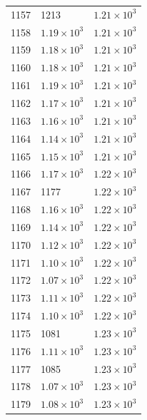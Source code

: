 \begin{table}[H]
\begin{tabular}{lll}
1157 & 1213 & $\displaystyle 1.21 \times 10^{3}$ \\
1158 & $\displaystyle 1.19 \times 10^{3}$ & $\displaystyle 1.21 \times 10^{3}$ \\
1159 & $\displaystyle 1.18 \times 10^{3}$ & $\displaystyle 1.21 \times 10^{3}$ \\
1160 & $\displaystyle 1.18 \times 10^{3}$ & $\displaystyle 1.21 \times 10^{3}$ \\
1161 & $\displaystyle 1.19 \times 10^{3}$ & $\displaystyle 1.21 \times 10^{3}$ \\
1162 & $\displaystyle 1.17 \times 10^{3}$ & $\displaystyle 1.21 \times 10^{3}$ \\
1163 & $\displaystyle 1.16 \times 10^{3}$ & $\displaystyle 1.21 \times 10^{3}$ \\
1164 & $\displaystyle 1.14 \times 10^{3}$ & $\displaystyle 1.21 \times 10^{3}$ \\
1165 & $\displaystyle 1.15 \times 10^{3}$ & $\displaystyle 1.21 \times 10^{3}$ \\
1166 & $\displaystyle 1.17 \times 10^{3}$ & $\displaystyle 1.22 \times 10^{3}$ \\
1167 & 1177 & $\displaystyle 1.22 \times 10^{3}$ \\
1168 & $\displaystyle 1.16 \times 10^{3}$ & $\displaystyle 1.22 \times 10^{3}$ \\
1169 & $\displaystyle 1.14 \times 10^{3}$ & $\displaystyle 1.22 \times 10^{3}$ \\
1170 & $\displaystyle 1.12 \times 10^{3}$ & $\displaystyle 1.22 \times 10^{3}$ \\
1171 & $\displaystyle 1.10 \times 10^{3}$ & $\displaystyle 1.22 \times 10^{3}$ \\
1172 & $\displaystyle 1.07 \times 10^{3}$ & $\displaystyle 1.22 \times 10^{3}$ \\
1173 & $\displaystyle 1.11 \times 10^{3}$ & $\displaystyle 1.22 \times 10^{3}$ \\
1174 & $\displaystyle 1.10 \times 10^{3}$ & $\displaystyle 1.22 \times 10^{3}$ \\
1175 & 1081 & $\displaystyle 1.23 \times 10^{3}$ \\
1176 & $\displaystyle 1.11 \times 10^{3}$ & $\displaystyle 1.23 \times 10^{3}$ \\
1177 & 1085 & $\displaystyle 1.23 \times 10^{3}$ \\
1178 & $\displaystyle 1.07 \times 10^{3}$ & $\displaystyle 1.23 \times 10^{3}$ \\
1179 & $\displaystyle 1.08 \times 10^{3}$ & $\displaystyle 1.23 \times 10^{3}$ \\

\end{tabular}
\end{table}
